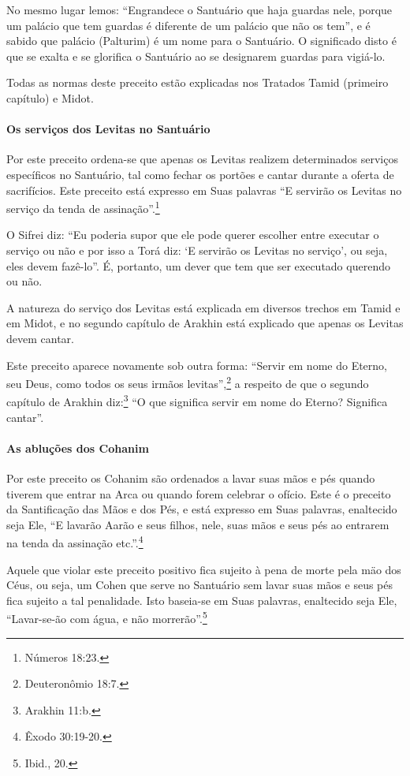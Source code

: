 No mesmo lugar lemos: ``Engrandece o Santuário que haja guardas nele,
porque um palácio que tem guardas é diferente de um palácio que não os
tem'', e é sabido que palácio (Palturim) é um nome para o Santuário. O
significado disto é que se exalta e se glorifica o Santuário ao se
designarem guardas para vigiá-lo.

Todas as normas deste preceito estão explicadas nos Tratados Tamid
(primeiro capítulo) e Midot.

\paragraph{Os serviços dos Levitas no Santuário}

Por este preceito ordena-se que apenas os Levitas realizem determinados
serviços específicos no Santuário, tal como fechar os portões e cantar
durante a oferta de sacrifícios. Este preceito está expresso em Suas
palavras ``E servirão os Levitas no serviço da tenda de assinação''.\footnote{Números 18:23.}

O Sifrei diz: ``Eu poderia supor que ele pode querer escolher entre
executar o serviço ou não e por isso a Torá diz: `E servirão os Levitas
no serviço', ou seja, eles devem fazê-lo''. É, portanto, um dever que
tem que ser executado querendo ou não.

A natureza do serviço dos Levitas está explicada em diversos trechos em
Tamid e em Midot, e no segundo capítulo de Arakhin está explicado que
apenas os Levitas devem cantar.

Este preceito aparece novamente sob outra forma: ``Servir em nome do
Eterno, seu Deus, como todos os seus irmãos levitas'',\footnote{Deuteronômio
18:7.} a respeito de que o segundo capítulo de Arakhin
diz:\footnote{Arakhin 11:b.} ``O que significa servir em nome do Eterno?
Significa cantar''.

\paragraph{As abluções dos Cohanim}

Por este preceito os Cohanim são ordenados a lavar suas mãos e pés
quando tiverem que entrar na Arca ou quando forem celebrar o ofício.
Este é o preceito da Santificação das Mãos e dos Pés, e está expresso em
Suas palavras, enaltecido seja Ele, ``E lavarão Aarão e seus filhos,
nele, suas mãos e seus pés ao entrarem na tenda da assinação etc.''.\footnote{Êxodo 30:19-20.}

Aquele que violar este preceito positivo fica sujeito à pena de morte
pela mäo dos Céus, ou seja, um Cohen que serve no Santuário sem
lavar suas mãos e seus pés fica sujeito a tal penalidade. Isto baseia-se
em Suas palavras, enaltecido seja Ele, ``Lavar-se-ão com água, e não
morrerão''.\footnote{Ibid., 20.}

